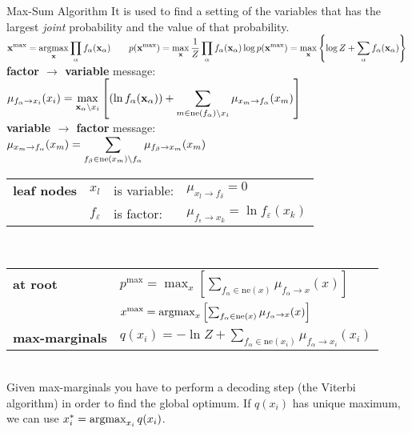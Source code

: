 \documentclass[a4paper,landscape]{amsmlaj}
\makeatletter
\renewcommand{\subsubsection}{\@startsection{subsubsection}{3}{0mm}
	{-1ex plus -.5ex minus -.2ex}
	{0.1ex plus .2ex}
	{\normalfont\footnotesize\bfseries}}
\makeatother
\begin{document}
\begin{multicols*}{3}
\subsubsection{Max-Sum Algorithm}
It is used to find a setting of the variables that has the largest
\textit{joint} probability and the value of that probability. \\
$\displaystyle\vt{x}^\text{max} = \argmax_{\vt{x}} \prod_\alpha f_\alpha(\vt{x}_\alpha)\qquad
p(\vt{x}^\text{max}) = \max_{\vt{x}} \frac{1}{Z} \prod_\alpha f_\alpha(\vt{x}_\alpha)\\
\log p(\vt{x}^\text{max}) = \max_{\vt{x}}\left\{\log Z + \sum_\alpha f_\alpha(\vt{x}_\alpha)\right\}\\$
\textbf{factor $\rightarrow$ variable} message:\\
$\displaystyle \mu_{f_\alpha \rightarrow x_i}(x_i) = \max_{\bm{\mathbf{x}}_\alpha
\setminus x_i} \left[ (\ln f_\alpha(\bm{\mathbf{x}}_\alpha)) +
\sum_{m \in \text{ne}(f_\alpha) \setminus x_i} \mu_{x_m \rightarrow f_\alpha}(x_m) \right] $\\
\textbf{variable $\rightarrow$ factor} message:\\
$\displaystyle \mu_{x_m \rightarrow f_\alpha}(x_m) =
\sum_{f_\beta \in \mathrm{ne}(x_m) \setminus f_\alpha} \mu_{f_\beta \rightarrow x_m}(x_m) \\$
\begin{tabular}{@{}llll}\\
	\textbf{leaf nodes} & $x_l$ & is variable: & $\mu_{x_l \rightarrow f_\delta} = 0$ \\
	& $f_\varepsilon$ & is factor: & $\mu_{f_\varepsilon \rightarrow x_k} = \ln f_\varepsilon(x_k)$
\end{tabular} \\
\begin{tabular}{@{}ll}
	\textbf{at root} & $p^\text{max}=
		\max_x \left[ \sum_{f_\alpha \in \text{ne}(x)}\mu_{f_\alpha \rightarrow x}(x) \right]$
	\\
	&$x^\text{max}=
		\argmax_x \left[ \sum_{f_\alpha \in \text{ne}(x)}\mu_{f_\alpha \rightarrow x}(x) \right]$ \\
	\textbf{max-marginals} & $q(x_i)=
	-\ln Z + \sum_{f_\alpha \in \text{ne}(x_i)} \mu_{f_\alpha \rightarrow x_i}(x_i)$
\end{tabular} \\
Given max-marginals you have to perform a decoding step (the Viterbi algorithm)
in order to find the global optimum. If $q(x_i)$ has unique maximum, we can use
$x_i^* = \argmax_{x_i} q(x_i)$.


\end{multicols*}
\end{document}
